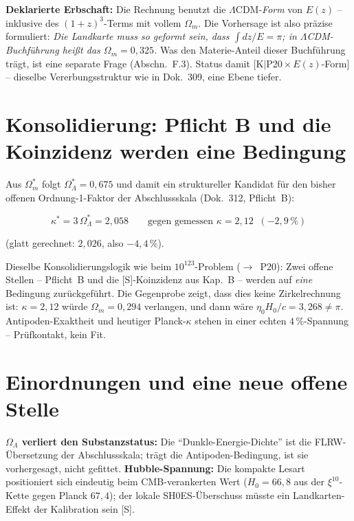 \documentclass[11pt]{report}
\begin{document}
\textbf{Deklarierte Erbschaft:} Die Rechnung benutzt die
$\Lambda$CDM-\emph{Form} von $E(z)$ -- inklusive des
$(1{+}z)^3$-Terms mit vollem $\Omega_m$. Die Vorhersage ist also
präzise formuliert: \emph{Die Landkarte muss so geformt sein,
dass $\int dz/E = \pi$; in $\Lambda$CDM-Buchführung heißt das
$\Omega_m = 0{,}325$.} Was den Materie-Anteil dieser Buchführung
trägt, ist eine separate Frage (Abschn.~F.3). Status damit
[K$|$P20\,$\times$\,$E(z)$-Form] -- dieselbe
Vererbungsstruktur wie in Dok.~309, eine Ebene tiefer.

\section{Konsolidierung: Pflicht B und die Koinzidenz werden eine
Bedingung}

Aus $\Omega_m^{*}$ folgt $\Omega_\Lambda^{*} = 0{,}675$ und damit
ein struktureller Kandidat für den bisher offenen
Ordnung-1-Faktor der Abschlussskala (Dok.~312, Pflicht~B):

\begin{equation}
  \kappa^{*} = 3\,\Omega_\Lambda^{*} = 2{,}058
  \qquad\text{gegen gemessen } \kappa = 2{,}12
  \;\;(-2{,}9\,\%)
\end{equation}

\noindent (glatt gerechnet: $2{,}026$, also $-4{,}4\,\%$).

Dieselbe Konsolidierungslogik wie beim $10^{123}$-Problem
($\to$~P20): Zwei offene Stellen -- Pflicht~B und die
[S]-Koinzidenz aus Kap.~B -- werden auf \emph{eine} Bedingung
zurückgeführt. Die Gegenprobe zeigt, dass dies keine
Zirkelrechnung ist: $\kappa = 2{,}12$ würde $\Omega_m = 0{,}294$
verlangen, und dann wäre $\eta_0 H_0/c = 3{,}268 \ne \pi$.
Antipoden-Exaktheit und heutiger Planck-$\kappa$ stehen in einer
echten $4\,\%$-Spannung -- Prüfkontakt, kein Fit.

\section{Einordnungen und eine neue offene Stelle}

\textbf{$\Omega_\Lambda$ verliert den Substanzstatus:} Die
\enquote{Dunkle-Energie-Dichte} ist die FLRW-Übersetzung der
Abschlussskala; trägt die Antipoden-Bedingung, ist sie
vorhergesagt, nicht gefittet. \textbf{Hubble-Spannung:} Die
kompakte Lesart positioniert sich eindeutig beim CMB-verankerten
Wert ($H_0 = 66{,}8$ aus der $\xi^{10}$-Kette gegen Planck
$67{,}4$); der lokale SH0ES-Überschuss müsste ein
Landkarten-Effekt der Kalibration sein [S].
\end{document}
